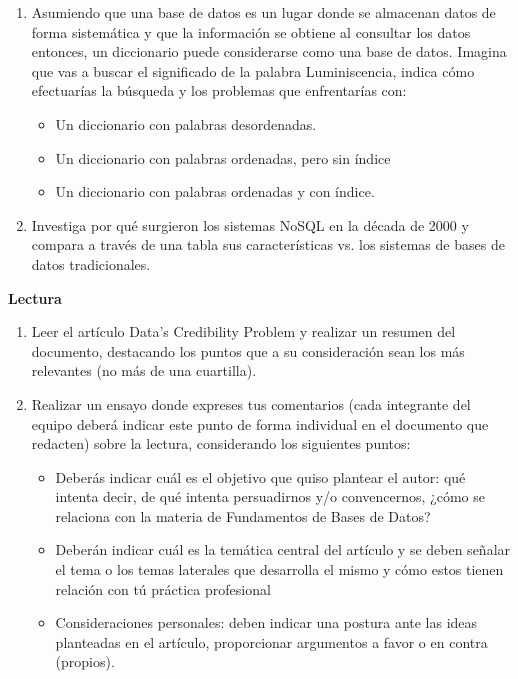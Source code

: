 \documentclass{exam}
\begin{document}
\begin{questions}
\begin{enumerate}[label=\alph*.]
		\item Asumiendo que una base de datos es un lugar donde se almacenan datos de forma sistemática y que la información se obtiene al consultar los datos entonces, un diccionario puede considerarse como una base de datos. Imagina que vas a buscar el significado de la palabra Luminiscencia, indica cómo efectuarías la búsqueda y los problemas que enfrentarías con:
		\begin{itemize}
			\item Un diccionario con palabras desordenadas.
			\item Un diccionario con palabras ordenadas, pero sin índice
			\item Un diccionario con palabras ordenadas y con índice.
		\end{itemize}
		\item Investiga por qué surgieron los sistemas NoSQL en la década de 2000 y compara a través de una tabla sus características vs. los sistemas de bases de datos tradicionales.
	\end{enumerate}
	
	\question \textbf{Lectura}
	\begin{enumerate}[label=\alph*.]
		\item Leer el artículo Data’s Credibility Problem y realizar un resumen del documento, destacando los puntos que a su consideración sean los más relevantes (no más de una cuartilla).
		\item Realizar un ensayo donde expreses tus comentarios (cada integrante del equipo deberá indicar este punto de forma individual en el documento que redacten) sobre la lectura, considerando los siguientes puntos:
		\begin{itemize}
			\item Deberás indicar cuál es el objetivo que quiso plantear el autor: qué intenta decir, de qué intenta persuadirnos y/o convencernos, ¿cómo se relaciona con la materia de Fundamentos de Bases de Datos?
			\item Deberán indicar cuál es la temática central del artículo y se deben señalar el tema o los temas laterales que desarrolla el mismo y cómo estos tienen relación con tú práctica profesional
			\item Consideraciones personales: deben indicar una postura ante las ideas planteadas en el artículo, proporcionar argumentos a favor o en contra (propios).
		\end{itemize}
	\end{enumerate}		
\end{questions}
\end{document}
